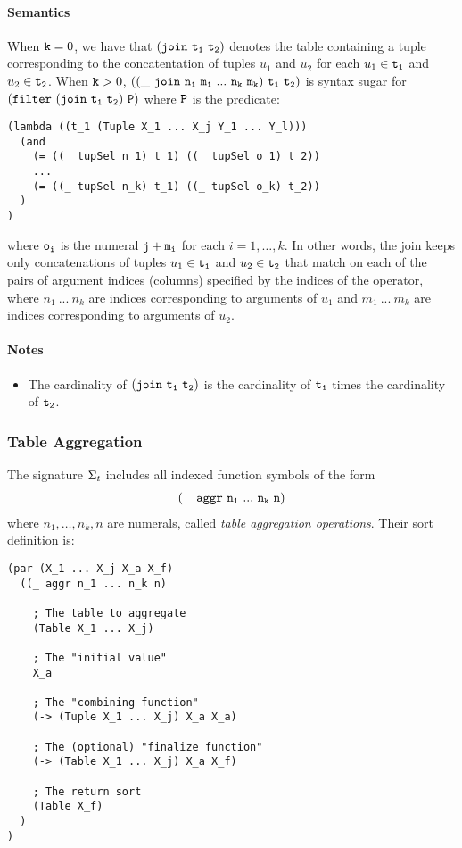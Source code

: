 \documentclass[english,a4paper,10pt]{article}
\begin{document}
\paragraph{Semantics}
When ${\tt k}=0$, we have that $\syntax{(join\ t_1\ t_2)}$
denotes the table containing a tuple corresponding to the concatentation
of tuples $u_1$ and $u_2$
for each $u_1 \in {\tt t_1}$ and $u_2 \in {\tt t_2}$.
When ${\tt k}>0$, $\syntax{((\_\ join\ n_1\ m_1\ ...\ n_k\ m_k)\ t_1\ t_2)}$
is syntax sugar for ${\tt (filter\ (join\ t_1\ t_2)\ P)}$ where ${\tt P}$ is
the predicate:
\begin{verbatim}
(lambda ((t_1 (Tuple X_1 ... X_j Y_1 ... Y_l)))
  (and
    (= ((_ tupSel n_1) t_1) ((_ tupSel o_1) t_2))
    ...
    (= ((_ tupSel n_k) t_1) ((_ tupSel o_k) t_2))
  )
)
\end{verbatim}
where ${\tt o_i}$ is the numeral ${\tt j+m_i}$ for each $i = 1, \ldots, k$.
In other words,
the join keeps only concatenations of tuples $u_1 \in {\tt t_1}$ and
$u_2 \in {\tt t_2}$ 
that match on each of the pairs of argument indices (columns) specified by
the indices of the operator,
where $n_1\ ...\ n_k$ are indices corresponding to arguments of $u_1$
and $m_1\ ...\ m_k$ are indices corresponding to arguments of $u_2$.

\paragraph{Notes}
\begin{itemize}
\item The cardinality of $\syntax{(join\ t_1\ t_2)}$
is the cardinality of ${\tt t_1}$ times the cardinality of ${\tt t_2}$.
\end{itemize}


\subsubsection{Table Aggregation}
The signature $\Sigma_{t}$ includes 
all indexed function symbols of the form
\begin{align*}
{\tt  
(\_\ aggr\ n_1\ ...\ n_k\ n)
}
\end{align*}
where $n_1, \ldots, n_k, n$ are numerals,
called \emph{table aggregation operations}. Their sort definition is:

\begin{verbatim}
(par (X_1 ... X_j X_a X_f) 
  ((_ aggr n_1 ... n_k n)
  
    ; The table to aggregate
    (Table X_1 ... X_j)
    
    ; The "initial value"
    X_a
    
    ; The "combining function"
    (-> (Tuple X_1 ... X_j) X_a X_a)
    
    ; The (optional) "finalize function"
    (-> (Table X_1 ... X_j) X_a X_f)
    
    ; The return sort
    (Table X_f)
  )
)
\end{verbatim}
\end{document}
